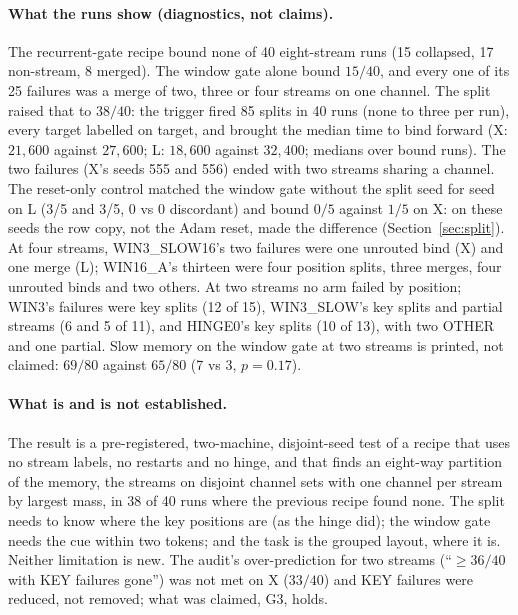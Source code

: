 \documentclass[11pt]{article}
\newcommand{\arm}[1]{\textsf{#1}}
\begin{document}
\paragraph{What the runs show (diagnostics, not claims).} The recurrent-gate recipe bound none of 40 eight-stream runs (15 collapsed, 17 non-stream, 8 merged). The window gate alone bound $15/40$, and every one of its 25 failures was a merge of two, three or four streams on one channel. The split raised that to $38/40$: the trigger fired 85 splits in 40 runs (none to three per run), every target labelled on target, and brought the median time to bind forward (X: $21{,}600$ against $27{,}600$; L: $18{,}600$ against $32{,}400$; medians over bound runs). The two failures (X's seeds 555 and 556) ended with two streams sharing a channel. The reset-only control matched the window gate without the split seed for seed on L (3/5 and 3/5, 0 vs 0 discordant) and bound $0/5$ against $1/5$ on X: on these seeds the row copy, not the Adam reset, made the difference (Section~\ref{sec:split}). At four streams, \arm{WIN3\_SLOW16}'s two failures were one unrouted bind (X) and one merge (L); \arm{WIN16\_A}'s thirteen were four position splits, three merges, four unrouted binds and two others. At two streams no arm failed by position; \arm{WIN3}'s failures were key splits (12 of 15), \arm{WIN3\_SLOW}'s key splits and partial streams (6 and 5 of 11), and \arm{HINGE0}'s key splits (10 of 13), with two OTHER and one partial. Slow memory on the window gate at two streams is printed, not claimed: $69/80$ against $65/80$ (7 vs 3, $p = 0.17$).

\paragraph{What is and is not established.} The result is a pre-registered, two-machine, disjoint-seed test of a recipe that uses no stream labels, no restarts and no hinge, and that finds an eight-way partition of the memory, the streams on disjoint channel sets with one channel per stream by largest mass, in 38 of 40 runs where the previous recipe found none. The split needs to know where the key positions are (as the hinge did); the window gate needs the cue within two tokens; and the task is the grouped layout, where it is. Neither limitation is new. The audit's over-prediction for two streams (``$\geq 36/40$ with KEY failures gone'') was not met on X ($33/40$) and KEY failures were reduced, not removed; what was claimed, G3, holds.
\end{document}
